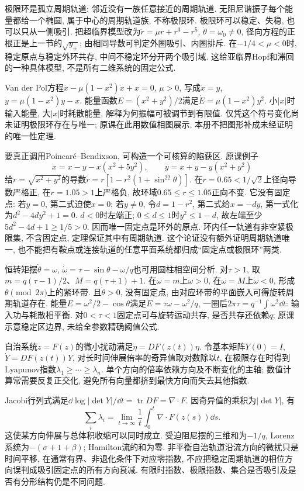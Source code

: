 极限环是孤立周期轨道: 邻近没有一族任意接近的周期轨道. 无阻尼谐振子每个能量都给一个椭圆, 属于中心的周期轨道族, 不称极限环. 极限环可以稳定、失稳, 也可以只从一侧吸引. 把超临界模型改为$\dot r=\mu r+r^3-r^5$, $\dot\theta=\omega_0\ne0$, 径向方程的正根正是上一节的$\sqrt{y_\pm}$; 由相同导数可判定外圈吸引、内圈排斥. 在$-1/4<\mu<0$时, 稳定原点与稳定外环共存, 中间不稳定环分开两个吸引域. 这给亚临界Hopf和滞回的一种具体模型, 不是所有二维系统的固定公式.

Van der Pol方程$\ddot x-\mu(1-x^2)\dot x+x=0$, $\mu>0$, 写成$\dot x=y$, $\dot y=\mu(1-x^2)y-x$. 能量函数$E=(x^2+y^2)/2$满足$\dot E=\mu(1-x^2)y^2$. 小$|x|$时输入能量, 大$|x|$时耗散能量, 解释为何振幅可被调节到有限值. 仅凭这个符号变化尚未证明极限环存在与唯一; 原课在此用数值相图展示, 本册不把图形补成未经证明的唯一性定理.

要真正调用Poincaré--Bendixson, 可构造一个可核算的陷获区. 原课例子
\[
\dot x=x-y-x(x^2+5y^2),\qquad
\dot y=x+y-y(x^2+y^2)
\]
给$r=\sqrt{x^2+y^2}$的导数$\dot r=r[1-r^2(1+\sin^22\theta)]$. 在$r=0.65<1/\sqrt2$上径向导数严格正, 在$r=1.05>1$上严格负, 故环域$0.65\le r\le1.05$正向不变. 它没有固定点: 若$y=0$, 第二式迫使$x=0$; 若$y\ne0$, 令$d=1-r^2$, 第二式给$x=-dy$, 第一式化为$d^2-4dy^2+1=0$. $d<0$时左端正; $0\le d\le1$时$y^2\le1-d$, 故左端至少$5d^2-4d+1\ge1/5>0$. 因而唯一固定点是环外的原点. 环内任一轨道有非空紧极限集, 不含固定点, 定理保证其中有周期轨道. 这个论证没有额外证明周期轨道唯一, 也不能把有鞍点或连接轨道的任意平面系统都归成“固定点或极限环”两类.

恒转矩摆$\dot\theta=\omega$, $\dot\omega=\tau-\sin\theta-\omega/q$也可用圆柱相空间分析. 对$\tau>1$, 取$m=q(\tau-1)/2$、$M=q(\tau+1)+1$. 在$\omega=m$上$\dot\omega>0$, 在$\omega=M$上$\dot\omega<0$, 形成$\theta\pmod{2\pi}$上的紧环带. 且$\dot\theta>0$, 没有固定点, 由对应环带的平面嵌入可得旋转周期轨道存在. 能量$E=\omega^2/2-\cos\theta$满足$\dot E=\tau\omega-\omega^2/q$, 一圈后$2\pi\tau=q^{-1}\int\omega^2\dd t$: 输入功与耗散相平衡. 对$0<\tau<1$固定点可与旋转运动共存, 是否共存还依赖$q$; 原课示意稳定区边界, 未给全参数精确阈值公式.

自治系统$\dot z=F(z)$的微小扰动满足$\dot\eta=DF(z(t))\eta$. 令基本矩阵$Y(0)=I$, $\dot Y=DF(z(t))Y$, 对长时间伸展倍率的奇异值取对数除以$t$, 在极限存在时得到Lyapunov指数$\lambda_1\ge\cdots\ge\lambda_n$. 单个方向的倍率依赖方向及不断变化的主轴; 数值计算常需要反复正交化, 避免所有向量都挤到最快方向而失去其他指数.

Jacobi行列式满足$\dd\log|\det Y|/\dd t=\operatorname{tr}DF=\nabla\cdot F$. 因奇异值的乘积为$|\det Y|$, 有
\[
\sum_i\lambda_i
=\lim_{t\to\infty}\frac1t\int_0^t\nabla\cdot F(z(s))\dd s.
\]
这使某方向伸展与总体积收缩可以同时成立. 受迫阻尼摆的三维和为$-1/q$, Lorenz系统为$-(\sigma+1+\beta)$; Hamilton流的和为零. 非平衡自治轨道沿流方向的微扰只是时间平移, 在通常有界、非退化条件下对应零指数, 不应把稳定周期轨道的相位方向误判成吸引固定点的所有方向衰减. 有限时指数、极限指数、集合是否吸引及是否有分形结构仍是不同问题.

